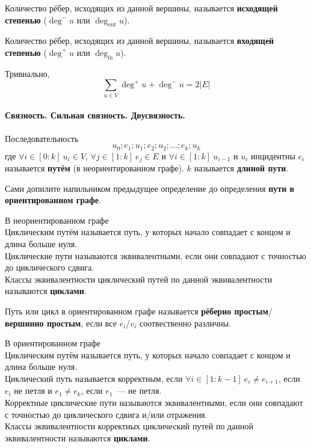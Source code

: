 \documentclass{article}
\begin{document}
    \begin{definition}
        Количество рёбер, исходящих из данной вершины, называется \textbf{исходящей степенью} ($\deg^-u$ или $\deg_{\mathrm{out}}u$).
    \end{definition}
    \begin{definition}
        Количество рёбер, исходящих из данной вершины, называется \textbf{входящей степенью} ($\deg^+u$ или $\deg_{\mathrm{in}}u$).
    \end{definition}
    \begin{lemma}
        Тривиально,
        $$
        \sum\limits_{u\in V}\deg^+u+\deg^-u=2|E|
        $$
    \end{lemma}
    \paragraph{Связность. Сильная связность. Двусвязность.}
    \begin{definition}
        Последовательность
        $$
        u_0;e_1;u_1;e_2;u_2;\ldots;e_k;u_k
        $$
        где $\forall i\in[0:k]~u_i\in V$, $\forall j\in[1:k]~e_j\in E$ и $\forall i\in[1:k]~u_{i-1}$ и $u_i$ инцидентны $e_i$ называется \textbf{путём} (в неориентированном графе). $k$ называется \textbf{длиной пути}.
    \end{definition}
    \begin{definition}
        Сами допилите напильником предыдущее определение до определения \textbf{пути в ориентированном графе}.
    \end{definition}
    \begin{definition}
        {\large В неориентированном графе}\\
        Циклическим путём называется путь, у которых начало совпадает с концом и длина больше нуля.\\
        Циклические пути называются эквивалентными, если они совпадают с точностью до циклического сдвига.\\
        Классы эквивалентности циклический путей по данной эквивалентности называются \textbf{циклами}.
    \end{definition}
    \begin{definition}
        Путь или цикл в ориентированном графе называется \textbf{рёберно простым}/\textbf{вершинно простым}, если все $e_i$/$v_i$ соотвественно различны.
    \end{definition}
    \begin{definition}
        {\large В ориентированном графе}\\
        Циклическим путём называется путь, у которых начало совпадает с концом и длина больше нуля.\\
        Циклический путь называется корректным, если $\forall i\in[1:k-1]~e_i\neq e_{i+1}$, если $e_i$ не петля и $e_1\neq e_k$, если $e_1$~--- не петля.\\
        Корректные циклические пути называются эквивалентными, если они совпадают с точностью до циклического сдвига и/или отражения.\\
        Классы эквивалентности корректных циклический путей по данной эквивалентности называются \textbf{циклами}.
    \end{definition}
\end{document}
